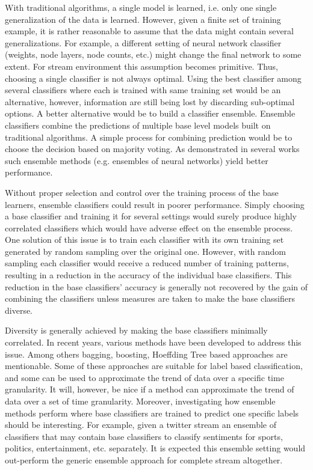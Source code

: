 With traditional algorithms, a single model is learned, i.e. only one single generalization of the data is learned. However, given a finite set of training example, it is rather reasonable to assume that the data might contain several generalizations. For example, a different setting of neural network classifier (weights, node layers, node counts, etc.) might change the final network to some extent. For stream environment this assumption becomes primitive. Thus, choosing a single classifier is not always optimal. Using the best classifier among several classifiers where each is trained with same training set would be an alternative, however, information are still being lost by discarding sub-optimal options. A better alternative would be to build a classifier ensemble. Ensemble classifiers combine the predictions of multiple base level models built on traditional algorithms. A simple process for combining prediction would be to choose the decision based on majority voting. As demonstrated in several works~\cite{breiman94:bagging, schapire90:whyens} such ensemble methods (e.g. ensembles of neural networks) yield better performance.

Without proper selection and control over the training process of the base learners, ensemble classifiers could result in poorer performance. Simply choosing a base classifier and training it for several settings would surely produce highly correlated classifiers which would have adverse effect on the ensemble process. One solution of this issue is to train each classifier with its own training set generated by random sampling over the original one. However, with random sampling each classifier would receive a reduced number of training patterns, resulting in a reduction in the accuracy of the individual base classifiers. This reduction in the base classifiers' accuracy is generally not recovered by the gain of combining the classifiers unless measures are taken to make the base classifiers diverse.

Diversity is generally achieved by making the base classifiers minimally correlated. In recent years, various methods have been developed to address this issue. Among others bagging, boosting, Hoeffding Tree based approaches are mentionable. Some of these approaches are suitable for label based classification, and some can be used to approximate the trend of data over a specific time granularity. It will, however, be nice if a method can approximate the trend of data over a set of time granularity. Moreover, investigating how ensemble methods perform where base classifiers are trained to predict one specific labels should be interesting. For example, given a twitter stream an ensemble of classifiers that may contain base classifiers to classify sentiments for sports, politics, entertainment, etc. separately. It is expected this ensemble setting would out-perform the generic ensemble approach for complete stream altogether.

